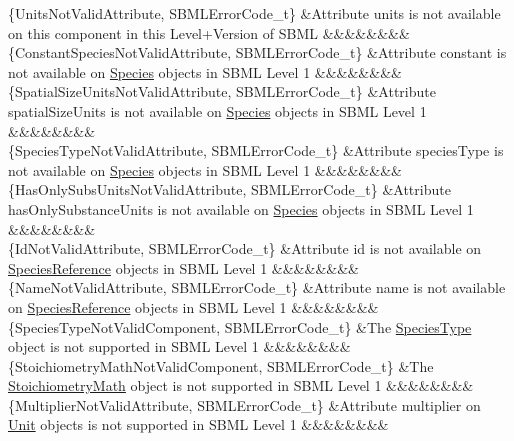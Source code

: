 \begin{DoxyParagraph}{}
\begin{longtabu}
\{Units\+Not\+Valid\+Attribute, S\+B\+M\+L\+Error\+Code\+\_\+t\} &Attribute \textquotesingle{}units\textquotesingle{} is not available on this component in this Level+\+Version of S\+B\+ML &&&&&&&&\\
\{Constant\+Species\+Not\+Valid\+Attribute, S\+B\+M\+L\+Error\+Code\+\_\+t\} &Attribute \textquotesingle{}constant\textquotesingle{} is not available on \hyperlink{class_species}{Species} objects in S\+B\+ML Level 1 &&&&&&&&\\
\{Spatial\+Size\+Units\+Not\+Valid\+Attribute, S\+B\+M\+L\+Error\+Code\+\_\+t\} &Attribute \textquotesingle{}spatial\+Size\+Units\textquotesingle{} is not available on \hyperlink{class_species}{Species} objects in S\+B\+ML Level 1 &&&&&&&&\\
\{Species\+Type\+Not\+Valid\+Attribute, S\+B\+M\+L\+Error\+Code\+\_\+t\} &Attribute \textquotesingle{}species\+Type\textquotesingle{} is not available on \hyperlink{class_species}{Species} objects in S\+B\+ML Level 1 &&&&&&&&\\
\{Has\+Only\+Subs\+Units\+Not\+Valid\+Attribute, S\+B\+M\+L\+Error\+Code\+\_\+t\} &Attribute \textquotesingle{}has\+Only\+Substance\+Units\textquotesingle{} is not available on \hyperlink{class_species}{Species} objects in S\+B\+ML Level 1 &&&&&&&&\\
\{Id\+Not\+Valid\+Attribute, S\+B\+M\+L\+Error\+Code\+\_\+t\} &Attribute \textquotesingle{}id\textquotesingle{} is not available on \hyperlink{class_species_reference}{Species\+Reference} objects in S\+B\+ML Level 1 &&&&&&&&\\
\{Name\+Not\+Valid\+Attribute, S\+B\+M\+L\+Error\+Code\+\_\+t\} &Attribute \textquotesingle{}name\textquotesingle{} is not available on \hyperlink{class_species_reference}{Species\+Reference} objects in S\+B\+ML Level 1 &&&&&&&&\\
\{Species\+Type\+Not\+Valid\+Component, S\+B\+M\+L\+Error\+Code\+\_\+t\} &The \hyperlink{class_species_type}{Species\+Type} object is not supported in S\+B\+ML Level 1 &&&&&&&&\\
\{Stoichiometry\+Math\+Not\+Valid\+Component, S\+B\+M\+L\+Error\+Code\+\_\+t\} &The \hyperlink{class_stoichiometry_math}{Stoichiometry\+Math} object is not supported in S\+B\+ML Level 1 &&&&&&&&\\
\{Multiplier\+Not\+Valid\+Attribute, S\+B\+M\+L\+Error\+Code\+\_\+t\} &Attribute \textquotesingle{}multiplier\textquotesingle{} on \hyperlink{class_unit}{Unit} objects is not supported in S\+B\+ML Level 1 &&&&&&&&\\

\end{longtabu}
\end{DoxyParagraph}
